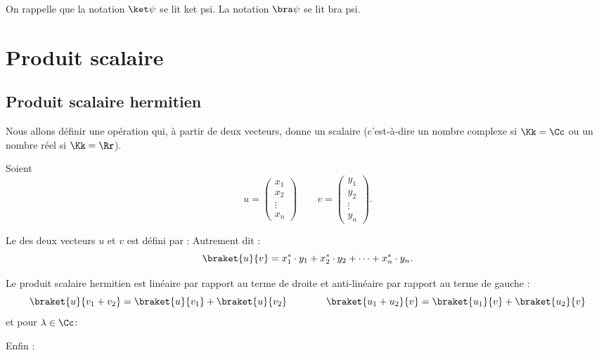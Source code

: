 \documentclass[11pt,class=report,crop=false]{standalone}
\begin{document}

On rappelle que la notation $\ket\psi$ se lit \og{}ket psi\fg{}.
La notation $\bra\psi$ se lit \og{}bra psi\fg{}.



\section{Produit scalaire}

\subsection{Produit scalaire hermitien}

Nous allons définir une opération qui, à partir de deux vecteurs, donne un scalaire (c'est-à-dire un nombre complexe si $\Kk=\Cc$ ou un nombre réel si $\Kk=\Rr$).

Soient $$u = \begin{pmatrix}x_1\\x_2\\\vdots\\x_n\end{pmatrix} \qquad 
v = \begin{pmatrix}y_1\\y_2\\\vdots\\y_n\end{pmatrix}.$$

Le  des deux vecteurs $u$ et $v$ est défini par :
Autrement dit :
$$\braket{u}{v} = x_1^* \cdot y_1 + x_2^* \cdot y_2 + \cdots + x_n^* \cdot y_n.$$

\begin{proposition}
Le produit scalaire hermitien est linéaire par rapport au terme de droite et anti-linéaire par rapport au terme de gauche :
$$\braket{u}{v_1 + v_2} = \braket{u}{v_1} + 
\braket{u}{v_2}
\qquad\qquad
\braket{u_1 + u_2}{v} = \braket{u_1}{v} + 
\braket{u_2}{v}$$
et pour $\lambda \in \Cc$:

Enfin :
\end{proposition}
\end{document}
